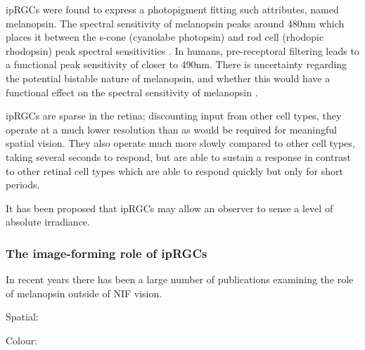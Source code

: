 \Glspl{ipRGC} were found to express a photopigment fitting such attributes, named melanopsin. The spectral sensitivity of melanopsin peaks around 480nm \citep{qiu_induction_2005,hankins_primary_2002,dacey_melanopsin-expressing_2005,peirson_melanopsin_2006,bailes_human_2013} which places it between the s-cone (cyanolabe photopsin) and rod cell (rhodopic rhodopsin) peak spectral sensitivities%
. In humans, pre-receptoral filtering leads to a functional peak sensitivity of closer to 490nm\citep{cie_cie_2015-1}. There is uncertainty regarding the potential bistable nature of melanopsin, and whether this would have a functional effect on the spectral sensitivity of melanopsin \citep{cie_cie_2015-1,mure_melanopsin_2009,rollag_does_2008}.

\Glspl{ipRGC} are sparse in the retina; discounting input from other cell types, they operate at a much lower resolution than as would be required for meaningful spatial vision. They also operate much more slowly compared to other cell types, taking several seconds to respond, but are able to sustain a response in contrast to other retinal cell types which are able to respond quickly but only for short periods.

It has been proposed that \glspl{ipRGC} may allow an observer to sense a level of absolute irradiance\citep{brown_melanopsin_2010}. 

\subsubsection{The image-forming role of ipRGCs}

In recent years there has been a large number of publications examining the role of melanopsin outside of \gls{NIF} vision.

Spatial:
\cite{ecker_melanopsin-expressing_2010}
\cite{spitschan_vision_2017}
\cite{mouland_responses_2017}
\cite{allen_melanopsin_2017}
\cite{allen_form_2019}

Colour:
\cite{cao_evidence_2018}
\cite{spitschan_human_2017-1}
\cite{zele_melanopsin_2018}